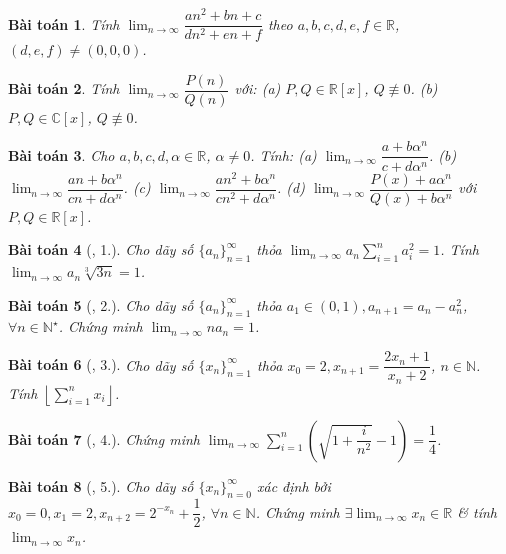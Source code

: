 \documentclass{article}
\newtheorem{baitoan}{Bài toán}
\begin{document}
\begin{baitoan}
	Tính $\lim_{n\to\infty} \dfrac{an^2 + bn + c}{dn^2 + en + f}$ theo $a,b,c,d,e,f\in\mathbb{R}$, $(d,e,f)\ne(0,0,0)$.
\end{baitoan}

\begin{baitoan}
	Tính $\lim_{n\to\infty} \dfrac{P(n)}{Q(n)}$ với: (a) $P,Q\in\mathbb{R}[x]$, $Q\not\equiv0$. (b) $P,Q\in\mathbb{C}[x]$, $Q\not\equiv0$.
\end{baitoan}

\begin{baitoan}
	Cho $a,b,c,d,\alpha\in\mathbb{R}$, $\alpha\ne0$. Tính: (a) $\lim_{n\to\infty} \dfrac{a + b\alpha^n}{c + d\alpha^n}$. (b) $\lim_{n\to\infty} \dfrac{an + b\alpha^n}{cn + d\alpha^n}$. (c) $\lim_{n\to\infty} \dfrac{an^2 + b\alpha^n}{cn^2 + d\alpha^n}$. (d) $\lim_{n\to\infty} \dfrac{P(x) + a\alpha^n}{Q(x) + b\alpha^n}$ với $P,Q\in\mathbb{R}[x]$.
\end{baitoan}

\begin{baitoan}[\cite{TLCT_dai_so_giai_tich_11}, 1.]
	Cho dãy số $\{a_n\}_{n=1}^\infty$ thỏa $\lim_{n\to\infty} a_n\sum_{i=1}^n a_i^2 = 1$. Tính $\lim_{n\to\infty} a_n\sqrt[3]{3n} = 1$.
\end{baitoan}

\begin{baitoan}[\cite{TLCT_dai_so_giai_tich_11}, 2.]
	Cho dãy số $\{a_n\}_{n=1}^\infty$ thỏa $a_1\in(0,1),a_{n+1} = a_n - a_n^2$, $\forall n\in\mathbb{N}^\star$. Chứng minh $\lim_{n\to\infty} na_n = 1$.
\end{baitoan}

\begin{baitoan}[\cite{TLCT_dai_so_giai_tich_11}, 3.]
	Cho dãy số $\{x_n\}_{n=1}^\infty$ thỏa $x_0 = 2,x_{n+1} = \dfrac{2x_n + 1}{x_n + 2}$, $n\in\mathbb{N}$. Tính $\left\lfloor\sum_{i=1}^n x_i\right\rfloor$.
\end{baitoan}

\begin{baitoan}[\cite{TLCT_dai_so_giai_tich_11}, 4.]
	Chứng minh $\lim_{n\to\infty} \sum_{i=1}^n \left(\sqrt{1 + \dfrac{i}{n^2}} - 1\right) = \dfrac{1}{4}$.
\end{baitoan}

\begin{baitoan}[\cite{TLCT_dai_so_giai_tich_11}, 5.]
	Cho dãy số $\{x_n\}_{n=0}^\infty$ xác định bởi $x_0 = 0,x_1 = 2,x_{n+2} = 2^{-x_n} + \dfrac{1}{2}$, $\forall n\in\mathbb{N}$. Chứng minh $\exists\lim_{n\to\infty} x_n\in\mathbb{R}$ \& tính $\lim_{n\to\infty} x_n$.
\end{baitoan}
\end{document}
